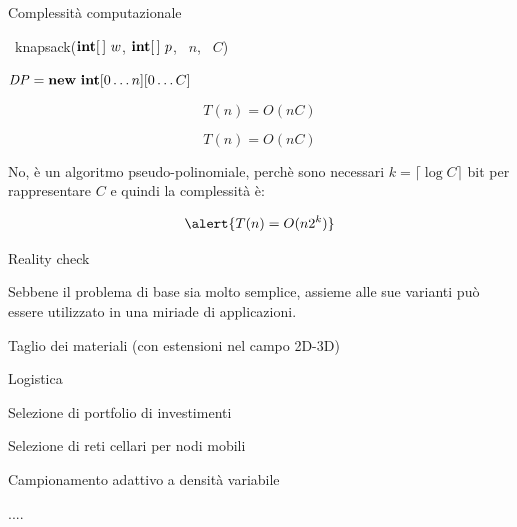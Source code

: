 \begin{frame}[fragile]{Complessità computazionale}


\begin{overprint}
\begingroup
\footnotesize
\begin{Procedure}
\caption[A]{\INTEGER\ \textsf{knapsack}($\INTEGER[\,]\ w$, $\INTEGER[\,]\ p$, \INTEGER\ $n$, \INTEGER\ $C$)}

$\mathit{DP} = \NEW\ \INTEGER[0 \ldots n][0 \ldots C]$\;
\;
\end{Procedure}
\endgroup
{}
\[ 
  T(n) = O(nC)
\]


\[ 
  T(n) = O(nC)
\]


\medskip
No, è un algoritmo \alert{pseudo-polinomiale}, perchè sono necessari \alert{$k = \lceil \log C \rceil$} bit
per rappresentare $C$ e quindi la complessità è:

\[
  \alert{T(n) = O(n 2^k) }
\]
\end{overprint}

\end{frame}

\begin{frame}{Reality check}

Sebbene il problema di base sia molto semplice, assieme alle sue varianti può essere utilizzato in una miriade di applicazioni.

\BIL
\item Taglio dei materiali (con estensioni nel campo 2D-3D)
\item Logistica
\item Selezione di portfolio di investimenti
\item Selezione di reti cellari per nodi mobili
\item Campionamento adattivo a densità variabile
\item ....
\EIL

\end{frame}





